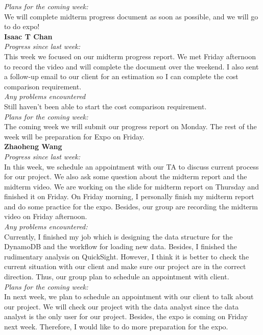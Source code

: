\noindent\textit{Plans for the coming week:}\\
We will complete midterm progress document as soon as possible, and we will go to do expo!\\

\noindent\textbf{Isaac T Chan}\\
\noindent\textit{Progress since last week:}\\
This week we focused on our midterm progress report. We met Friday afternoon to record the video and will complete the document over the weekend. I also sent a follow-up email to our client for an estimation so I can complete the cost comparison requirement.\\

\noindent\textit{Any problems encountered}\\
Still haven't been able to start the cost comparison requirement.\\

\noindent\textit{Plans for the coming week:}\\
The coming week we will submit our progress report on Monday. The rest of the week will be preparation for Expo on Friday.\\

\noindent\textbf{Zhaoheng Wang}\\
\noindent\textit{Progress since last week:}\\
In this week, we schedule an appointment with our TA to discuss current process for our project. We also ask some question about the midterm report and the midterm video. We are working on the slide for midterm report on Thursday and finished it on Friday. On Friday morning, I personally finish my midterm report and do some practice for the expo. Besides, our group are recording the midterm video on Friday afternoon.\\

\noindent\textit{Any problems encountered:}\\
Currently, I finished my job which is designing the data structure for the DynamoDB and the workflow for loading new data. Besides, I finished the rudimentary analysis on QuickSight. However, I think it is better to check the current situation with our client and make sure our project are in the correct direction. Thus, our group plan to schedule an appointment with client.\\

\noindent\textit{Plans for the coming week:}\\
In next week, we plan to schedule an appointment with our client to talk about our project. We will check our project with the data analyst since the data analyst is the only user for our project. Besides, the expo is coming on Friday next week. Therefore, I would like to do more preparation for the expo.\\

